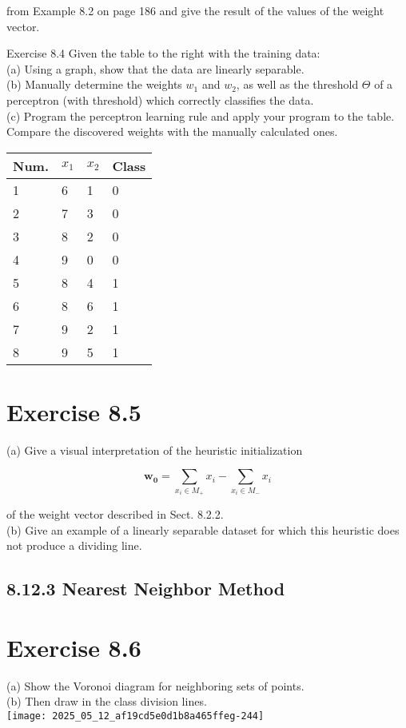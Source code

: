 \documentclass[10pt]{article}
\begin{document}
from Example 8.2 on page 186 and give the result of the values of the weight vector.

Exercise 8.4 Given the table to the right with the training data:\\
(a) Using a graph, show that the data are linearly separable.\\
(b) Manually determine the weights $w_{1}$ and $w_{2}$, as well as the threshold $\Theta$ of a perceptron (with threshold) which correctly classifies the data.\\
(c) Program the perceptron learning rule and apply your program to the table. Compare the discovered weights with the manually calculated ones.

\begin{center}
\begin{tabular}{llll}
\hline
Num. & $x_{1}$ & $x_{2}$ & Class \\
\hline
1 & 6 & 1 & 0 \\
\hline
2 & 7 & 3 & 0 \\
\hline
3 & 8 & 2 & 0 \\
\hline
4 & 9 & 0 & 0 \\
\hline
5 & 8 & 4 & 1 \\
\hline
6 & 8 & 6 & 1 \\
\hline
7 & 9 & 2 & 1 \\
\hline
8 & 9 & 5 & 1 \\
\hline
\end{tabular}
\end{center}

\section*{Exercise 8.5}
(a) Give a visual interpretation of the heuristic initialization

$$
\boldsymbol{w}_{\mathbf{0}}=\sum_{x_{i} \in M_{+}} x_{i}-\sum_{x_{i} \in M_{-}} x_{i}
$$

of the weight vector described in Sect. 8.2.2.\\
(b) Give an example of a linearly separable dataset for which this heuristic does not produce a dividing line.

\subsection*{8.12.3 Nearest Neighbor Method}
\section*{Exercise 8.6}
(a) Show the Voronoi diagram for neighboring sets of points.\\
(b) Then draw in the class division lines.\\
\texttt{[image: 2025\_05\_12\_af19cd5e0d1b8a465ffeg-244]}
\end{document}

